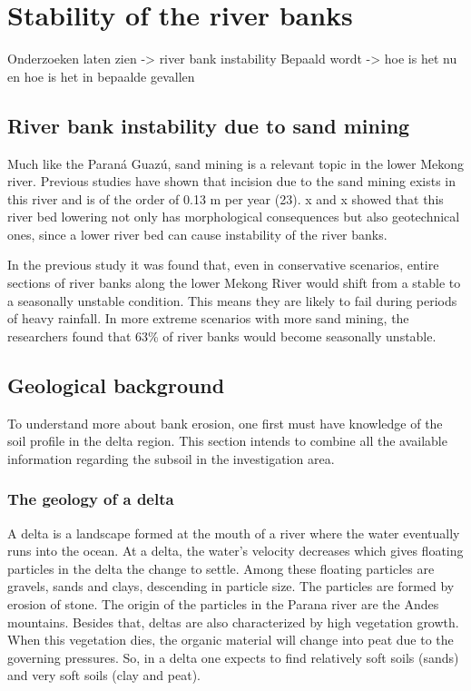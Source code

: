 \chapter{Stability of the river banks}

Onderzoeken laten zien -> river bank instability
Bepaald wordt -> hoe is het nu en hoe is het in bepaalde gevallen

\section{River bank instability due to sand mining}
Much like the Paraná Guazú, sand mining is a relevant topic in the lower Mekong river. Previous studies have shown that incision due to the sand mining exists in this river and is of the order of 0.13 m per year (23). x and x showed that this river bed lowering not only has morphological consequences but also geotechnical ones, since a lower river bed can cause instability of the river banks.

In the previous study it was found that, even in conservative scenarios, entire sections of river banks along the lower Mekong River would shift from a stable to a seasonally unstable condition. This means they are likely to fail during periods of heavy rainfall. In more extreme scenarios with more sand mining, the researchers found that 63\% of river banks would become seasonally unstable.

\section{Geological background}
To understand more about bank erosion, one first must have knowledge of the soil profile in the delta region. This section intends to combine all the available information regarding the subsoil in the investigation area.

\subsection{The geology of a delta}
A delta is a landscape formed at the mouth of a river where the water eventually runs into the ocean. At a delta, the water's velocity decreases which gives floating particles in the delta the change to settle. Among these floating particles are gravels, sands and clays, descending in particle size. The particles are formed by erosion of stone. The origin of the particles in the Parana river are the Andes mountains. 
Besides that, deltas are also characterized by high vegetation growth. When this vegetation dies, the organic material will change into peat due to the governing pressures. So, in a delta one expects to find relatively soft soils (sands) and very soft soils (clay and peat).

